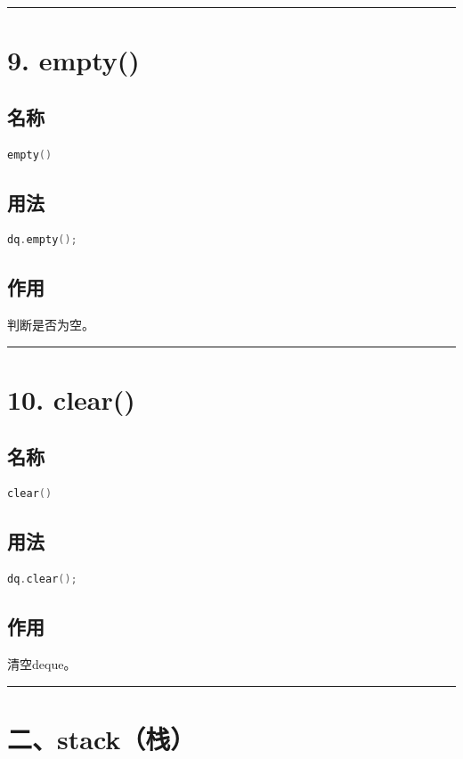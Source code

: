 \documentclass[10pt,twocolumn]{extarticle}
\begin{document}
\noindent\rule{\linewidth}{0.4pt}

\section{9. empty()}

\subsection{名称}
\begin{lstlisting}[language=C++]
empty()
\end{lstlisting}

\subsection{用法}
\begin{lstlisting}[language=C++]
dq.empty();
\end{lstlisting}

\subsection{作用}
判断是否为空。

\noindent\rule{\linewidth}{0.4pt}

\section{10. clear()}

\subsection{名称}
\begin{lstlisting}[language=C++]
clear()
\end{lstlisting}

\subsection{用法}
\begin{lstlisting}[language=C++]
dq.clear();
\end{lstlisting}

\subsection{作用}
清空deque。

\noindent\rule{\linewidth}{0.4pt}

\section{二、stack（栈）}
\end{document}
